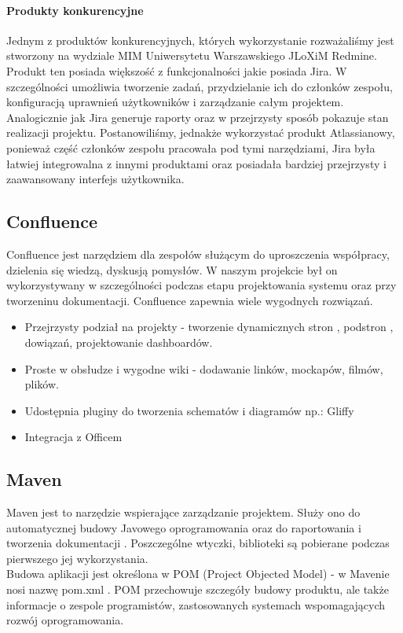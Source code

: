 \documentclass[licencjacka]{pracamgr}
\begin{document}
\paragraph{Produkty konkurencyjne}
Jednym z produktów konkurencyjnych, których wykorzystanie rozważaliśmy jest stworzony na wydziale MIM Uniwersytetu Warszawskiego JLoXiM Redmine.
Produkt ten posiada większość z funkcjonalności jakie posiada Jira. W szczególności umożliwia tworzenie zadań, przydzielanie ich do członków zespołu, 
konfiguracją uprawnień użytkowników i zarządzanie całym projektem. Analogicznie jak Jira generuje raporty oraz w przejrzysty sposób pokazuje stan 
realizacji projektu.
Postanowiliśmy, jednakże wykorzystać produkt Atlassianowy, ponieważ część członków zespołu pracowała pod tymi narzędziami, Jira była łatwiej integrowalna
 z innymi produktami oraz posiadała bardziej przejrzysty i zaawansowany interfejs użytkownika.
\subsection{Confluence}
Confluence jest narzędziem dla zespołów służącym do uproszczenia współpracy, dzielenia się wiedzą, dyskusją pomysłów.
W naszym projekcie był on wykorzystywany w szczególności podczas etapu projektowania systemu oraz przy tworzeninu dokumentacji.
Confluence zapewnia wiele wygodnych rozwiązań.
\begin{itemize}
\item Przejrzysty podział na projekty - tworzenie dynamicznych stron , podstron , dowiązań, projektowanie dashboardów.
\item Proste w obsłudze i wygodne wiki - dodawanie linków, mockapów, filmów, plików.
\item Udostępnia pluginy do tworzenia schematów i diagramów np.: Gliffy
\item Integracja z Officem  
\end{itemize}
\subsection{Maven}
Maven jest to narzędzie wspierające zarządzanie projektem. 
Służy ono do automatycznej budowy Javowego oprogramowania oraz do raportowania i tworzenia dokumentacji . 
Poszczególne wtyczki, biblioteki są pobierane podczas pierwszego jej wykorzystania.  \\


Budowa aplikacji jest określona w POM (Project Objected Model) - w Mavenie nosi nazwę pom.xml . 
POM przechowuje szczegóły budowy produktu, ale także  informacje o zespole programistów, zastosowanych systemach wspomagających rozwój oprogramowania.\\
\end{document}
